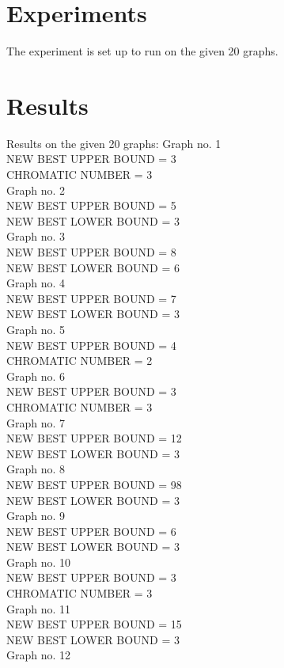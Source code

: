 \documentclass[a4paper]{report}
\begin{document}
		
	\chapter{Experiments}
	The experiment is set up to run on the given 20 graphs.
	\chapter{Results}
	Results on the given 20 graphs:
	Graph no. 1\\
	NEW BEST UPPER BOUND = 3\\
	CHROMATIC NUMBER = 3\\
	Graph no. 2\\
	NEW BEST UPPER BOUND = 5\\
	NEW BEST LOWER BOUND = 3\\
	Graph no. 3\\
	NEW BEST UPPER BOUND = 8\\
	NEW BEST LOWER BOUND = 6\\
	Graph no. 4\\
	NEW BEST UPPER BOUND = 7\\
	NEW BEST LOWER BOUND = 3\\
	Graph no. 5\\
	NEW BEST UPPER BOUND = 4\\
	CHROMATIC NUMBER = 2\\
	Graph no. 6\\
	NEW BEST UPPER BOUND = 3\\
	CHROMATIC NUMBER = 3\\
	Graph no. 7\\
	NEW BEST UPPER BOUND = 12\\
	NEW BEST LOWER BOUND = 3\\
	Graph no. 8\\
	NEW BEST UPPER BOUND = 98\\
	NEW BEST LOWER BOUND = 3\\
	Graph no. 9\\
	NEW BEST UPPER BOUND = 6\\
	NEW BEST LOWER BOUND = 3\\
	Graph no. 10\\
	NEW BEST UPPER BOUND = 3\\
	CHROMATIC NUMBER = 3\\
	Graph no. 11\\
	NEW BEST UPPER BOUND = 15\\
	NEW BEST LOWER BOUND = 3\\
	Graph no. 12\\
\end{document}
